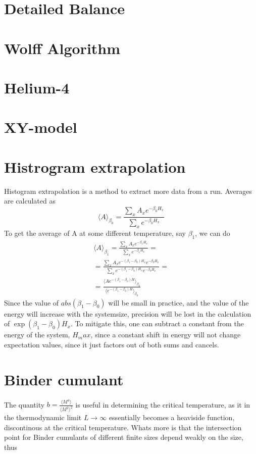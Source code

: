 \documentclass[a4paper]{article}
\begin{document}
\section{Detailed Balance}
\section{Wolff Algorithm}

\section{Helium-4}
\section{XY-model}
\section{Histrogram extrapolation}
Histogram extrapolation is a method to extract more data from a run. 
Averages are calculated as
\begin{equation}
  \langle A \rangle_{\beta_0} =  \frac{\sum_{x}A_x e^{-\beta_0 H_x}}{\sum_{x}e^{-\beta_0 H_x}}
  \label{}
\end{equation}
To get the average of A at some different temperature, say $\beta_1$, we can do
\begin{align}
  \langle A\rangle_{\beta_1} =  \frac{\sum_{x}A_x e^{-\beta_1 H_x}}{\sum_{x}e^{-\beta_1 H_x}} = \\
  = \frac{\sum_x A_x e^{-(\beta_1 - \beta_0)H_x} e^{-\beta_0 H_x}}{\sum_x e^{-(\beta_1 - \beta_0)H_x}e^{-\beta_0 H_x}} = \\
  = \frac{\langle A e^{-(\beta_1 - \beta_0)H}\rangle_{\beta_0}}{\langle e^{-(\beta_1 - \beta_0)H}\rangle_{\beta_0}}
\end{align}
Since the value of $abs(\beta_1 -\beta_0)$ will be small in practice, and the value of the energy will increase with the systemsize, precision will be lost in the calculation of $\exp\left( \beta_1 - \beta_0 \right)H_x$. To mitigate this, one can subtract a constant from the energy of the system, $H_max$, since a constant shift in energy will not change expectation values, since it just factors out of both sums and cancels.
\section{Binder cumulant}
The quantity $b =\frac{\langle M^4 \rangle}{\langle M^2\rangle^2}$ is useful in determining the critical temperature, as it in the thermodynamic limit $L\rightarrow \infty $ essentially becomes a heaviside function, discontinous at the critical temperature. Whats more is that the intersection point for Binder cumulants of different finite sizes depend weakly on the size, thus 
\end{document}
